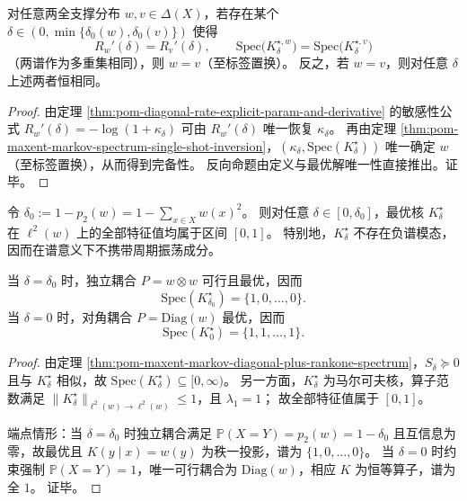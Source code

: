 \begin{corollary}[谱--信息不变量的完备性]\label{cor:pom-maxent-markov-spectrum-rate-complete-invariant}
对任意两全支撑分布 \(w,v\in\Delta(X)\)，若存在某个 \(\delta\in(0,\min\{\delta_0(w),\delta_0(v)\})\) 使得
\[
R_w'(\delta)=R_v'(\delta),
\qquad
\mathrm{Spec}\bigl(K_{\delta}^{\star,w}\bigr)=\mathrm{Spec}\bigl(K_{\delta}^{\star,v}\bigr)
\]
（两谱作为多重集相同），则 \(w=v\)（至标签置换）。
反之，若 \(w=v\)，则对任意 \(\delta\) 上述两者恒相同。
\end{corollary}
\begin{proof}
由定理 \ref{thm:pom-diagonal-rate-explicit-param-and-derivative} 的敏感性公式 \(R_w'(\delta)=-\log(1+\kappa_\delta)\) 可由 \(R_w'(\delta)\) 唯一恢复 \(\kappa_\delta\)。
再由定理 \ref{thm:pom-maxent-markov-spectrum-single-shot-inversion}，\((\kappa_\delta,\mathrm{Spec}(K^\star_\delta))\) 唯一确定 \(w\)（至标签置换），从而得到完备性。
反向命题由定义与最优解唯一性直接推出。证毕。
\end{proof}

\begin{corollary}[无振荡性与两端谱塌缩]\label{cor:pom-maxent-markov-no-oscillation-endpoints}
令 \(\delta_0:=1-p_2(w)=1-\sum_{x\in X}w(x)^2\)。
则对任意 \(\delta\in[0,\delta_0]\)，最优核 \(K^\star_\delta\) 在 \(\ell^2(w)\) 上的全部特征值均属于区间 \([0,1]\)。
特别地，\(K^\star_\delta\) 不存在负谱模态，因而在谱意义下不携带周期振荡成分。
\par
当 \(\delta=\delta_0\) 时，独立耦合 \(P=w\otimes w\) 可行且最优，因而
\[
\mathrm{Spec}(K^\star_{\delta_0})=\{1,0,\dots,0\}.
\]
当 \(\delta=0\) 时，对角耦合 \(P=\mathrm{Diag}(w)\) 最优，因而
\[
\mathrm{Spec}(K^\star_0)=\{1,1,\dots,1\}.
\]
\end{corollary}
\begin{proof}
由定理 \ref{thm:pom-maxent-markov-diagonal-plus-rankone-spectrum}，\(S_\delta\succeq0\) 且与 \(K^\star_\delta\) 相似，故 \(\mathrm{Spec}(K^\star_\delta)\subseteq[0,\infty)\)。
另一方面，\(K^\star_\delta\) 为马尔可夫核，算子范数满足 \(\|K^\star_\delta\|_{\ell^2(w)\to \ell^2(w)}\le 1\)，且 \(\lambda_1=1\)；
故全部特征值属于 \([0,1]\)。
\par
端点情形：当 \(\delta=\delta_0\) 时独立耦合满足 \(\mathbb P(X=Y)=p_2(w)=1-\delta_0\) 且互信息为零，故最优且
\(
K(y\mid x)=w(y)
\) 为秩一投影，谱为 \(\{1,0,\dots,0\}\)。
当 \(\delta=0\) 时约束强制 \(\mathbb P(X=Y)=1\)，唯一可行耦合为 \(\mathrm{Diag}(w)\)，相应 \(K\) 为恒等算子，谱为全 \(1\)。
证毕。
\end{proof}


